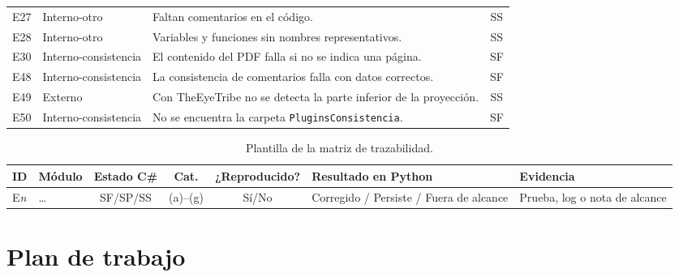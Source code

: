 \begin{table}[H]
\begin{tabularx}{\textwidth}{l l X c}
E27 & Interno-otro & Faltan comentarios en el código. & SS \\
E28 & Interno-otro & Variables y funciones sin nombres representativos. & SS \\
E30 & Interno-consistencia & El contenido del PDF falla si no se indica una página. & SF \\
E48 & Interno-consistencia & La consistencia de comentarios falla con datos correctos. & SF \\
E49 & Externo & Con TheEyeTribe no se detecta la parte inferior de la proyección. & SS \\
E50 & Interno-consistencia & No se encuentra la carpeta \texttt{PluginsConsistencia}. & SF \\ \bottomrule
\end{tabularx}
\end{table}

\begin{table}[H]
\centering
\caption{Plantilla de la matriz de trazabilidad.}
\label{tab:plantilla_traz}
\footnotesize
\begin{tabularx}{\textwidth}{l l c c c >{\raggedright\arraybackslash}X >{\raggedright\arraybackslash}X}
\toprule
\textbf{ID} & \textbf{Módulo} & \textbf{Estado C\#} & \textbf{Cat.} & \textbf{¿Reproducido?} & \textbf{Resultado en Python} & \textbf{Evidencia} \\ \midrule
E\textit{n} & \dots & SF/SP/SS & (a)--(g) & Sí/No & Corregido / Persiste / Fuera de alcance & Prueba, log o nota de alcance \\ \bottomrule
\end{tabularx}
\end{table}

\chapter{Plan de trabajo}
\label{an:plan}


